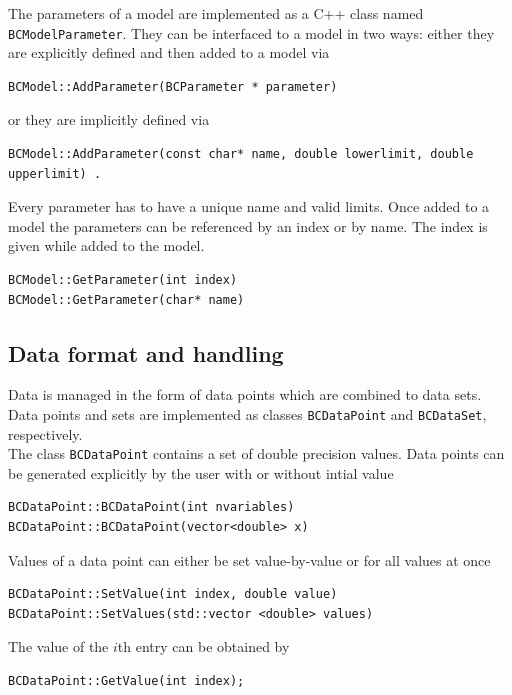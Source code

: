 \documentclass[11pt, a4paper]{article}
\begin{document}
\noindent 
The parameters of a model are implemented as a C++ class named
\verb|BCModelParameter|. They can be interfaced to a model in two
ways: either they are explicitly defined and then added to a model via 
%
\begin{verbatim}
BCModel::AddParameter(BCParameter * parameter) 
\end{verbatim}

\noindent 
or they are implicitly defined via 
%
\begin{verbatim}
BCModel::AddParameter(const char* name, double lowerlimit, double upperlimit) . 
\end{verbatim}

\noindent 
Every parameter has to have a unique name and valid limits. Once added
to a model the parameters can be referenced by an index or by
name. The index is given while added to the model. 
%
\begin{verbatim} 
BCModel::GetParameter(int index) 
BCModel::GetParameter(char* name) 
\end{verbatim}  


\subsection{Data format and handling} 
\label{subsection:data} 

Data is managed in the form of data points which are combined to data
sets. Data points and sets are implemented as classes
\verb|BCDataPoint| and \verb|BCDataSet|, respectively. \\ 

\noindent 
The class \verb|BCDataPoint| contains a set of double precision
values. Data points can be generated explicitly by the user with or
without intial value 
%
\begin{verbatim} 
BCDataPoint::BCDataPoint(int nvariables)
BCDataPoint::BCDataPoint(vector<double> x) 
\end{verbatim} 

\noindent 
Values of a data point can either be set value-by-value or for all
values at once
%
\begin{verbatim} 
BCDataPoint::SetValue(int index, double value)  
BCDataPoint::SetValues(std::vector <double> values) 
\end{verbatim} 

\noindent 
The value of the $i$th entry can be obtained by 
%
\begin{verbatim}
BCDataPoint::GetValue(int index); 
\end{verbatim} 
\end{document}

